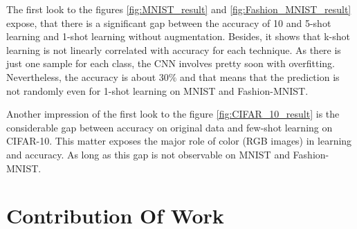 The first look to the figures \ref{fig:MNIST_result} and \ref{fig:Fashion_MNIST_result} expose, that there is
a significant gap between the accuracy of 10 and 5-shot learning and 1-shot learning without augmentation. Besides,
it shows that k-shot learning is not linearly correlated with accuracy for each technique. As there is
just one sample for each class, the CNN involves pretty soon with overfitting. Nevertheless, the
accuracy is about $30\%$ and that means that the prediction is not randomly even for 1-shot
learning on MNIST and Fashion-MNIST. 

Another impression of the first look to the figure \ref{fig:CIFAR_10_result} is the considerable gap between accuracy on original data and few-shot learning on CIFAR-10. This matter exposes the major role of color (RGB images) in learning and accuracy. As long as this gap is not observable on MNIST and Fashion-MNIST. 

\chapter{Contribution Of Work}